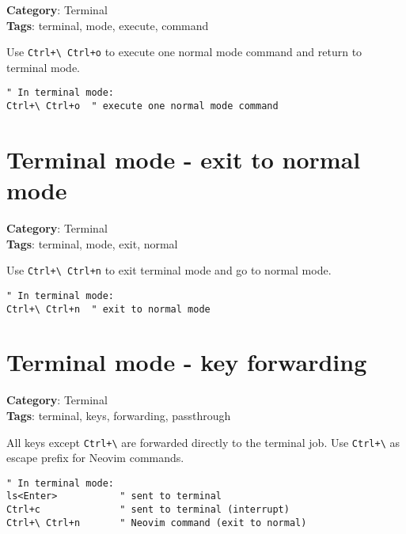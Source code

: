 {{{{{{{{{{{{{\textbf{Category}: Terminal\\ \textbf{Tags}: terminal, mode, execute, command
\vspace{0.5cm}

Use {\footnotesize \Verb§Ctrl+\ Ctrl+o§} to execute one normal mode command and return to terminal mode.

\begin{Exa*}{}
\begin{Verbatim}[fontsize=\footnotesize, breaklines, breakanywhere]
" In terminal mode:
Ctrl+\ Ctrl+o  " execute one normal mode command
\end{Verbatim}
\end{Exa*}

\section{Terminal mode - exit to normal mode}

\textbf{Category}: Terminal\\ \textbf{Tags}: terminal, mode, exit, normal
\vspace{0.5cm}

Use {\footnotesize \Verb§Ctrl+\ Ctrl+n§} to exit terminal mode and go to normal mode.

\begin{Exa*}{}
\begin{Verbatim}[fontsize=\footnotesize, breaklines, breakanywhere]
" In terminal mode:
Ctrl+\ Ctrl+n  " exit to normal mode
\end{Verbatim}
\end{Exa*}

\section{Terminal mode - key forwarding}

\textbf{Category}: Terminal\\ \textbf{Tags}: terminal, keys, forwarding, passthrough
\vspace{0.5cm}

All keys except {\footnotesize \Verb§Ctrl+\§} are forwarded directly to the terminal job. Use {\footnotesize \Verb§Ctrl+\§} as escape prefix for Neovim commands.

\begin{Exa*}{}
\begin{Verbatim}[fontsize=\footnotesize, breaklines, breakanywhere]
" In terminal mode:
ls<Enter>           " sent to terminal
Ctrl+c              " sent to terminal (interrupt)
Ctrl+\ Ctrl+n       " Neovim command (exit to normal)
\end{Verbatim}
\end{Exa*}

}}}}}}}}}}}}}
